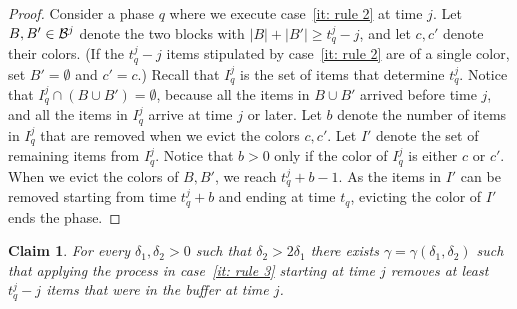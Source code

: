 \documentclass[11pt]{article}
\newtheorem{claim}[theorem]{Claim}
\begin{document}
\begin{proof}
Consider a phase $q$ where we execute case~\ref{it: rule 2}
at time $j$.
Let $B,B'\in {\cal B}^j$ denote the two blocks with
$|B| + |B'|\ge t^j_q - j$, and let $c,c'$ denote their
colors. (If the $t^j_q - j$ items stipulated by
case~\ref{it: rule 2} are of a single color, set
$B' = \emptyset$ and $c' = c$.)
Recall that $I^j_q$ is the set of items that determine
$t^j_q$. Notice that
$I^j_q\cap (B\cup B') = \emptyset$, because all
the items in $B\cup B'$ arrived before time $j$,
and all the items in $I^j_q$ arrive at time $j$ or
later. Let $b$ denote the number of items in
$I^j_q$ that are removed when we evict the colors
$c,c'$. Let $I'$ denote the set of remaining items
from $I^j_q$. Notice that $b > 0$ only if the color
of $I^j_q$ is either $c$ or $c'$. When we evict the
colors of $B,B'$, we reach $t^j_q+b-1$. As the items
in $I'$ can be removed starting from time $t^j_q+b$
and ending at time $t_q$, evicting the color of
$I'$ ends the phase.
\end{proof}

\begin{claim}\label{cl: rule3_a}
For every $\delta_1,\delta_2 > 0$ such that $\delta_2 > 2\delta_1$
there exists $\gamma =\gamma(\delta_1,\delta_2)$ such that
applying the process in case~\ref{it: rule 3} starting at time $j$
removes at least $t^j_q-j$ items that were in the buffer at time $j$.
\end{claim}
\end{document}
